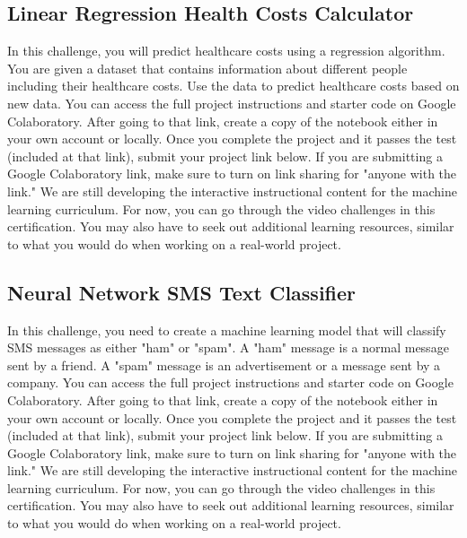 \documentclass{article}%
\begin{document}
%
\subsection{Linear Regression Health Costs Calculator}%
\label{subsec:LinearRegressionHealthCostsCalculator}%
In this challenge, you will predict healthcare costs using a regression algorithm.\newline%
You are given a dataset that contains information about different people including their healthcare costs. Use the data to predict healthcare costs based on new data.\newline%
You can access the full project instructions and starter code on Google Colaboratory.\newline%
After going to that link, create a copy of the notebook either in your own account or locally. Once you complete the project and it passes the test (included at that link), submit your project link below. If you are submitting a Google Colaboratory link, make sure to turn on link sharing for "anyone with the link."\newline%
We are still developing the interactive instructional content for the machine learning curriculum. For now, you can go through the video challenges in this certification. You may also have to seek out additional learning resources, similar to what you would do when working on a real{-}world project.\newline%

%
\subsection{Neural Network SMS Text Classifier}%
\label{subsec:NeuralNetworkSMSTextClassifier}%
In this challenge, you need to create a machine learning model that will classify SMS messages as either "ham" or "spam". A "ham" message is a normal message sent by a friend. A "spam" message is an advertisement or a message sent by a company.\newline%
You can access the full project instructions and starter code on Google Colaboratory.\newline%
After going to that link, create a copy of the notebook either in your own account or locally. Once you complete the project and it passes the test (included at that link), submit your project link below. If you are submitting a Google Colaboratory link, make sure to turn on link sharing for "anyone with the link."\newline%
We are still developing the interactive instructional content for the machine learning curriculum. For now, you can go through the video challenges in this certification. You may also have to seek out additional learning resources, similar to what you would do when working on a real{-}world project.\newline%

%
\newpage%
\end{document}
